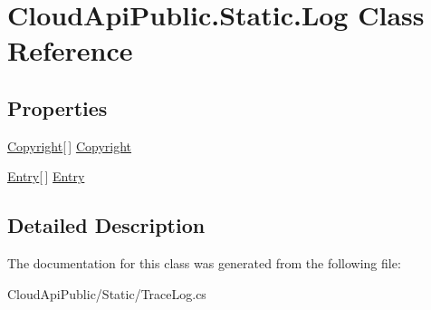 \hypertarget{class_cloud_api_public_1_1_static_1_1_log}{\section{Cloud\-Api\-Public.\-Static.\-Log Class Reference}
\label{class_cloud_api_public_1_1_static_1_1_log}
}


 


\subsection*{Properties}
\begin{DoxyCompactItemize}
\item 
\hypertarget{class_cloud_api_public_1_1_static_1_1_log_a2a8fbfcea60593656c6bffee28eb05b0}{\hyperlink{class_cloud_api_public_1_1_static_1_1_copyright}{Copyright}\mbox{[}$\,$\mbox{]} \hyperlink{class_cloud_api_public_1_1_static_1_1_log_a2a8fbfcea60593656c6bffee28eb05b0}{Copyright}}\label{class_cloud_api_public_1_1_static_1_1_log_a2a8fbfcea60593656c6bffee28eb05b0}

\begin{DoxyCompactList}\small\item\em \end{DoxyCompactList}\item 
\hypertarget{class_cloud_api_public_1_1_static_1_1_log_aee2ad7e696b713b58944ce47ba685905}{\hyperlink{class_cloud_api_public_1_1_static_1_1_entry}{Entry}\mbox{[}$\,$\mbox{]} \hyperlink{class_cloud_api_public_1_1_static_1_1_log_aee2ad7e696b713b58944ce47ba685905}{Entry}}\label{class_cloud_api_public_1_1_static_1_1_log_aee2ad7e696b713b58944ce47ba685905}

\begin{DoxyCompactList}\small\item\em \end{DoxyCompactList}\end{DoxyCompactItemize}


\subsection{Detailed Description}


The documentation for this class was generated from the following file\-:\begin{DoxyCompactItemize}
\item 
Cloud\-Api\-Public/\-Static/Trace\-Log.\-cs\end{DoxyCompactItemize}
